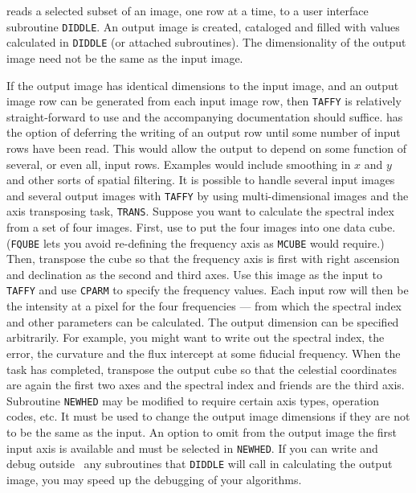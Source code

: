      {\tt {}} reads a selected subset of an image, one row
at a time, to a user interface subroutine \hbox{{\tt DIDDLE}}.  An
output image is created, cataloged and filled with values calculated
in {\tt DIDDLE} (or attached subroutines).  The dimensionality of the
output image need not be the same as the input image.

\xben
\Item If the output image has identical dimensions to the
    input image, and an output image row can be generated from each
    input image row, then {\tt TAFFY} is relatively straight-forward
    to use and the accompanying documentation should suffice.
 has the option of deferring the writing of an
    output row until some number of input rows have been read.  This
    would allow the output to depend on some function of several, or
    even all, input rows.  Examples would include smoothing in $x$ and
    $y$ and other sorts of spatial filtering.
\Item It is possible to handle several input images and several
    output images with {\tt TAFFY} by using multi-dimensional images
    and the axis transposing task, \hbox{{\tt TRANS}}.  Suppose you
    want to calculate the spectral index from a set of four images.
    First, use {\tt {}} to put the four images into one
    data cube.  ({\tt FQUBE} lets you avoid re-defining the frequency
    axis as {\tt MCUBE} would require.)  Then, transpose the cube so
    that the frequency axis is first with right ascension and
    declination as the second and third axes.  Use this image as the
    input to {\tt TAFFY} and use {\tt CPARM} to specify the frequency
    values.  Each input row will then be the intensity at a pixel for
    the four frequencies --- from which the spectral index and other
    parameters can be calculated.  The output dimension can be
    specified arbitrarily.  For example, you might want to write out
    the spectral index, the error, the curvature and the flux
    intercept at some fiducial frequency.  When the task has
    completed, transpose the output cube so that the celestial
    coordinates are again the first two axes and the spectral index
    and friends are the third axis.
\Item Subroutine {\tt NEWHED} may be modified to require certain
    axis types, operation codes, etc.  It must be used to change the
    output image dimensions if they are not to be the same as the
    input.  An option to omit from the output image the first input
    axis is available and must be selected in \hbox{{\tt NEWHED}}.
\Item If you can write and debug outside \AIPS\ any subroutines
    that {\tt DIDDLE} will call in calculating the output image, you
    may speed up the debugging of your algorithms.
\xeen

